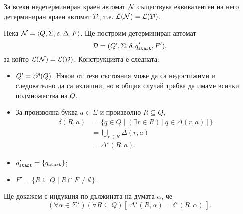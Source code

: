 \begin{framed}
\begin{thm}
  За всеки недетерминиран краен автомат $\mathcal{N}$ съществува еквивалентен на него детерминиран краен автомат $\mathcal{D}$, т.е. $\mathcal{L}(\mathcal{N}) = \mathcal{L}(\mathcal{D})$.
\end{thm}
\end{framed}
\begin{hint}
  Нека $\mathcal{N} = \langle{Q,\Sigma,s,\Delta,F}\rangle$. Ще построим детерминиран автомат
  \[\mathcal{D} = (Q',\Sigma,\delta,q_{\texttt{start}}',F'),\]
  за който $\mathcal{L}(\mathcal{N}) = \mathcal{L}(\mathcal{D})$.
  Конструкцията е следната:
  \begin{itemize}
  \item
    $Q' = \mathscr{P}(Q)$. Някои от тези състояния може да са недостижими и следователно да са излишни, но в общия случай трябва да имаме
    всички подмножества на $Q$.
  \item
    За произволна буква $a\in\Sigma$ и произволно $R \subseteq Q$,
    \begin{align*}
      \delta(R,a) & = \{q\in Q\mid (\exists r\in R)[q\in\Delta(r,a)]\}\\
                  & = \bigcup_{r\in R}\Delta(r,a)\\
                  & = \Delta^\star(R,a).
    \end{align*}
  \item
    $q_{\texttt{start}}' = \{q_{\texttt{start}}\}$;
  \item
    $F' = \{R \subseteq Q \mid R\cap F \neq \emptyset\}$.
  \end{itemize}
  Ще докажем с индукция по дължината на думата $\alpha$, че
  \begin{equation}
    \label{eq:6}
    (\forall \alpha\in\Sigma^\star)(\forall R \subseteq Q)[\ \Delta^\star(R,\alpha) = \delta^\star(R,\alpha)\ ].
  \end{equation}


\end{hint}
